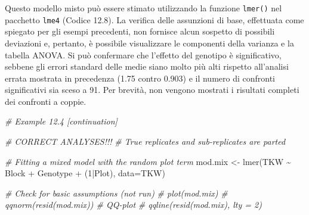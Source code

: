 \documentclass[
  12pt,
]{book}
\newenvironment{Shaded}{\begin{snugshade}}{\end{snugshade}}
\newcommand{\AttributeTok}[1]{\textcolor[rgb]{0.77,0.63,0.00}{#1}}
\newcommand{\CommentTok}[1]{\textcolor[rgb]{0.56,0.35,0.01}{\textit{#1}}}
\newcommand{\DecValTok}[1]{\textcolor[rgb]{0.00,0.00,0.81}{#1}}
\newcommand{\FunctionTok}[1]{\textcolor[rgb]{0.00,0.00,0.00}{#1}}
\newcommand{\NormalTok}[1]{#1}
\newcommand{\OtherTok}[1]{\textcolor[rgb]{0.56,0.35,0.01}{#1}}
\newcommand{\SpecialCharTok}[1]{\textcolor[rgb]{0.00,0.00,0.00}{#1}}
\begin{document}
Questo modello misto può essere stimato utilizzando la funzione \texttt{lmer()} nel pacchetto \texttt{lme4} (Codice 12.8). La verifica delle assunzioni di base, effettuata come spiegato per gli esempi precedenti, non fornisce alcun sospetto di possibili deviazioni e, pertanto, è possibile visualizzare le componenti della varianza e la tabella ANOVA. Si può confermare che l'effetto del genotipo è significativo, sebbene gli errori standard delle medie siano molto più alti rispetto all'analisi errata mostrata in precedenza (1.75 contro 0.903) e il numero di confronti significativi sia sceso a 91. Per brevità, non vengono mostrati i risultati completi dei confronti a coppie.

\begin{Shaded}
\begin{Highlighting}[]
\CommentTok{\# Example 12.4 [continuation]}

\CommentTok{\# CORRECT ANALYSES!!!}
\CommentTok{\# True replicates and sub{-}replicates are parted}


\CommentTok{\# Fitting a mixed model with the random \textquotesingle{}plot\textquotesingle{} term}
\NormalTok{mod.mix }\OtherTok{\textless{}{-}} \FunctionTok{lmer}\NormalTok{(TKW }\SpecialCharTok{\textasciitilde{}}\NormalTok{ Block }\SpecialCharTok{+}\NormalTok{ Genotype }\SpecialCharTok{+}\NormalTok{ (}\DecValTok{1}\SpecialCharTok{|}\NormalTok{Plot), }\AttributeTok{data=}\NormalTok{TKW)}

\CommentTok{\# Check for basic assumptions (not run)}
\CommentTok{\# plot(mod.mix)}
\CommentTok{\# qqnorm(resid(mod.mix)) \# QQ{-}plot}
\CommentTok{\# qqline(resid(mod.mix), lty = 2)}


\end{Highlighting}
\end{Shaded}
\end{document}
